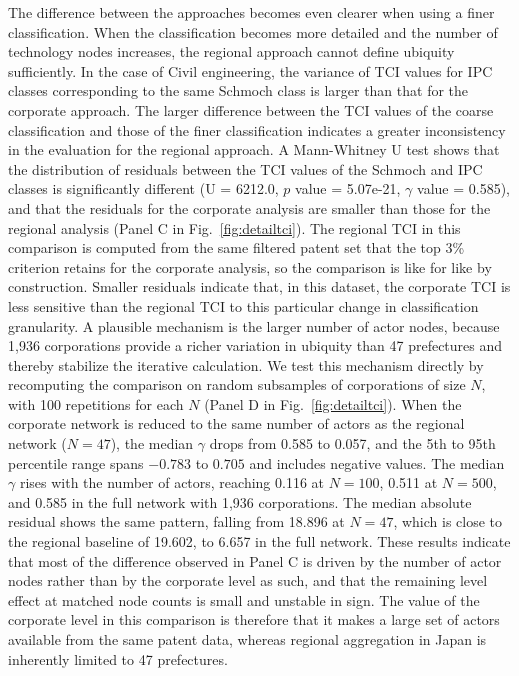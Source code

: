 \documentclass[lineno,pdflatex,sn-mathphys-num]{sn-jnl}%
\theoremstyle{thmstyleone}%
\theoremstyle{thmstyletwo}%
\theoremstyle{thmstylethree}%
\begin{document}
The difference between the approaches becomes even clearer when using a finer classification.
When the classification becomes more detailed and the number of technology nodes increases, the regional approach cannot define ubiquity sufficiently.
In the case of Civil engineering, the variance of TCI values for IPC classes corresponding to the same Schmoch class is larger than that for the corporate approach.
The larger difference between the TCI values of the coarse classification and those of the finer classification indicates a greater inconsistency in the evaluation for the regional approach.
A Mann-Whitney U test shows that the distribution of residuals between the TCI values of the Schmoch and IPC classes is significantly different (U = 6212.0, $p$ value = 5.07e-21, $\gamma$ value = 0.585), and that the residuals for the corporate analysis are smaller than those for the regional analysis (Panel C in Fig.~\ref{fig:detailtci}).
The regional TCI in this comparison is computed from the same filtered patent set that the top 3\% criterion retains for the corporate analysis, so the comparison is like for like by construction.
Smaller residuals indicate that, in this dataset, the corporate TCI is less sensitive than the regional TCI to this particular change in classification granularity.
A plausible mechanism is the larger number of actor nodes, because 1,936 corporations provide a richer variation in ubiquity than 47 prefectures and thereby stabilize the iterative calculation.
We test this mechanism directly by recomputing the comparison on random subsamples of corporations of size $N$, with 100 repetitions for each $N$ (Panel D in Fig.~\ref{fig:detailtci}).
When the corporate network is reduced to the same number of actors as the regional network ($N = 47$), the median $\gamma$ drops from 0.585 to 0.057, and the 5th to 95th percentile range spans $-0.783$ to $0.705$ and includes negative values.
The median $\gamma$ rises with the number of actors, reaching 0.116 at $N = 100$, 0.511 at $N = 500$, and 0.585 in the full network with 1,936 corporations.
The median absolute residual shows the same pattern, falling from 18.896 at $N = 47$, which is close to the regional baseline of 19.602, to 6.657 in the full network.
These results indicate that most of the difference observed in Panel C is driven by the number of actor nodes rather than by the corporate level as such, and that the remaining level effect at matched node counts is small and unstable in sign.
The value of the corporate level in this comparison is therefore that it makes a large set of actors available from the same patent data, whereas regional aggregation in Japan is inherently limited to 47 prefectures.
\end{document}
